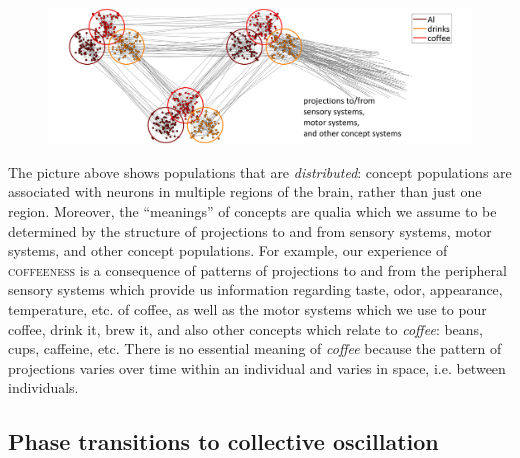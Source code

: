   
\begin{figure}
\includegraphics[width=\textwidth]{figures/Tilsen-img9.png}
\caption{\missingcaption}
\label{fig:}
\end{figure}
 

  The picture above shows populations that are \textit{distributed}: concept populations are associated with neurons in multiple regions of the brain, rather than just one region. Moreover, the “meanings” of concepts are qualia which we assume to be determined by the structure of projections to and from sensory systems, motor systems, and other concept populations. For example, our experience of \textsc{coffeeness} is a consequence of patterns of projections to and from the peripheral sensory systems which provide us information regarding taste, odor, appearance, temperature, etc. of coffee, as well as the motor systems which we use to pour coffee, drink it, brew it, and also other concepts which relate to \textit{coffee}: beans, cups, caffeine, etc. There is no essential meaning of \textit{coffee} because the pattern of projections varies over time within an individual and varies in space, i.e. between individuals.

\subsection{{\textbf{Phase transitions to collective oscillation}}}

